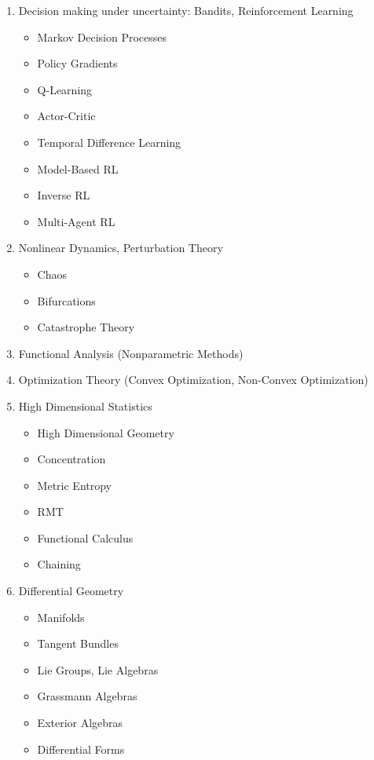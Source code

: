 \documentclass[12pt]{article}
\begin{document}
\begin{enumerate}
    \item Decision making under uncertainty: Bandits, Reinforcement Learning
    \begin{itemize}
        \item Markov Decision Processes
        \item Policy Gradients
        \item Q-Learning
        \item Actor-Critic
        \item Temporal Difference Learning
        \item Model-Based RL
        \item Inverse RL
        \item Multi-Agent RL
    \end{itemize}

    \item Nonlinear Dynamics, Perturbation Theory 
    \begin{itemize}
        \item Chaos
        \item Bifurcations
        \item Catastrophe Theory
    \end{itemize}
    \item Functional Analysis (Nonparametric Methods)
    \item Optimization Theory (Convex Optimization, Non-Convex Optimization)
    \item High Dimensional Statistics 
    \begin{itemize}
        \item High Dimensional Geometry
        \item Concentration
        \item Metric Entropy
        \item RMT
        \item Functional Calculus
        \item Chaining
    \end{itemize}
    \item Differential Geometry 
    \begin{itemize}
        \item Manifolds
        \item Tangent Bundles
        \item Lie Groups, Lie Algebras
        \item Grassmann Algebras
        \item Exterior Algebras
        \item Differential Forms

\end{itemize}
\end{enumerate}
\end{document}
